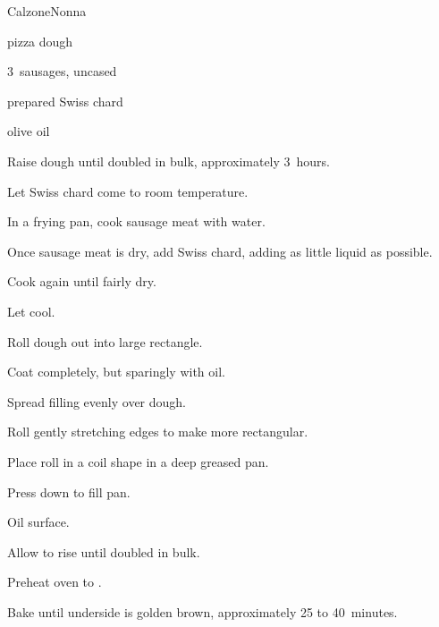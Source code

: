 \begin{recipe}{Calzone}{Nonna}{}

\begin{ingredients}
\item pizza dough
\item 3~sausages, uncased
\item prepared Swiss chard
\item olive oil
\end{ingredients}

\begin{directions}
\item Raise dough until doubled in bulk, approximately 3~hours.
\item Let Swiss chard come to room temperature.
\item In a frying pan, cook sausage meat with \C{\quarter} water.
\item Once sausage meat is dry, add Swiss chard, adding as little liquid as possible.
\item Cook again until fairly dry.
\item Let cool.
\item Roll dough out into large rectangle.
\item Coat completely, but sparingly with oil.
\item Spread filling evenly over dough.
\item Roll gently stretching edges to make more rectangular.
\item Place roll in a coil shape in a deep greased pan.
\item Press down to fill pan.
\item Oil surface.
\item Allow to rise until doubled in bulk.
\item Preheat oven to .
\item Bake until underside is golden brown, approximately 25 to 40~minutes.
\end{directions}

\end{recipe}

